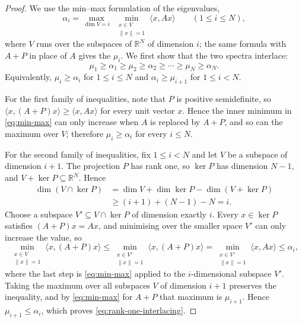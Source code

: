\documentclass[11pt]{article}
\theoremstyle{definition}
\theoremstyle{remark}
\newcommand{\R}{\mathbb{R}}
\begin{document}
\begin{proof}
  We use the min--max formulation of the eigenvalues,
  \begin{equation}
    \alpha_i
    =\max_{\dim V=i}\ \min_{\substack{x\in V\\ \|x\|=1}}\langle x,Ax\rangle
    \qquad(1\le i\le N),
    \label{eq:min-max}
  \end{equation}
  where $V$ runs over the subspaces of $\R^N$ of dimension $i$; the same
  formula with $A+P$ in place of $A$ gives the $\mu_i$.  We first show that
  the two spectra interlace:
  \begin{equation}
    \mu_1\ge\alpha_1\ge\mu_2\ge\alpha_2\ge\cdots\ge\mu_N\ge\alpha_N.
    \label{eq:rank-one-interlacing}
  \end{equation}
  Equivalently, $\mu_i\ge\alpha_i$ for $1\le i\le N$ and
  $\alpha_i\ge\mu_{i+1}$ for $1\le i<N$.

  For the first family of inequalities, note that $P$ is positive
  semidefinite, so
  $\langle x,(A+P)x\rangle\ge\langle x,Ax\rangle$ for every unit vector $x$.
  Hence the inner minimum in \eqref{eq:min-max} can only increase when $A$ is
  replaced by $A+P$, and so can the maximum over $V$; therefore
  $\mu_i\ge\alpha_i$ for every $i\le N$.

  For the second family of inequalities, fix $1\le i<N$ and let $V$ be a
  subspace of dimension $i+1$.  The projection $P$ has rank one, so $\ker P$
  has dimension $N-1$, and $V+\ker P\subseteq\R^N$.  Hence
  \begin{align*}
    \dim(V\cap\ker P)
    &=\dim V+\dim\ker P-\dim(V+\ker P)\\
    &\ge(i+1)+(N-1)-N
    =i.
  \end{align*}
  Choose a subspace $V'\subseteq V\cap\ker P$ of dimension exactly $i$.
  Every $x\in\ker P$ satisfies $(A+P)x=Ax$, and minimising over the smaller
  space $V'$ can only increase the value, so
  \[
    \min_{\substack{x\in V\\ \|x\|=1}}\langle x,(A+P)x\rangle
    \le\min_{\substack{x\in V'\\ \|x\|=1}}\langle x,(A+P)x\rangle
    =\min_{\substack{x\in V'\\ \|x\|=1}}\langle x,Ax\rangle
    \le\alpha_i,
  \]
  where the last step is \eqref{eq:min-max} applied to the $i$-dimensional
  subspace $V'$.  Taking the maximum over all subspaces $V$ of dimension
  $i+1$ preserves the inequality, and by \eqref{eq:min-max} for $A+P$ that
  maximum is $\mu_{i+1}$.  Hence $\mu_{i+1}\le\alpha_i$, which proves
  \eqref{eq:rank-one-interlacing}.


\end{proof}
\end{document}
